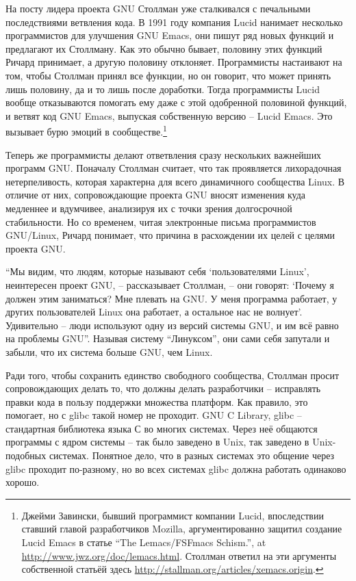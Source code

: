 На посту лидера проекта GNU Столлман уже сталкивался с печальными последствиями ветвления кода. В 1991 году компания Lucid нанимает несколько программистов для улучшения GNU Emacs, они пишут ряд новых функций и предлагают их Столлману. Как это обычно бывает, половину этих функций Ричард принимает, а другую половину отклоняет. Программисты настаивают на том, чтобы Столлман принял все функции, но он говорит, что может принять лишь половину, да и то лишь после доработки. Тогда программисты Lucid вообще отказываются помогать ему даже с этой одобренной половиной функций, и ветвят код GNU Emacs, выпуская собственную версию -- Lucid Emacs. Это вызывает бурю эмоций в сообществе.\footnote{Джейми Завински, бывший программист компании Lucid, впоследствии ставший главой разработчиков Mozilla, аргументированно защитил создание Lucid Emacs в статье \enquote{The Lemacs/FSFmacs Schism.}, at \url{http://www.jwz.org/doc/lemacs.html}. Столлман ответил на эти аргументы собственной статьёй здесь \url{http://stallman.org/articles/xemacs.origin}.}

Теперь же программисты делают ответвления сразу нескольких важнейших программ GNU. Поначалу Столлман считает, что так проявляется лихорадочная нетерпеливость, которая характерна для всего динамичного сообщества Linux. В отличие от них, сопровождающие проекта GNU вносят изменения куда медленнее и вдумчивее, анализируя их с точки зрения долгосрочной стабильности. Но со временем, читая электронные письма программистов GNU/Linux, Ричард понимает, что причина в расхождении их целей с целями проекта GNU.

\enquote{Мы видим, что людям, которые называют себя \enquote{пользователями Linux}, неинтересен проект GNU, -- рассказывает Столлман, -- они говорят: \enquote{Почему я должен этим заниматься? Мне плевать на GNU. У меня программа работает, у других пользователей Linux она работает, а остальное нас не волнует}. Удивительно -- люди используют одну из версий системы GNU, и им всё равно на проблемы GNU}. Называя систему \enquote{Линуксом}, они сами себя запутали и забыли, что их система больше GNU, чем Linux.

Ради того, чтобы сохранить единство свободного сообщества, Столлман просит сопровождающих делать то, что должны делать разработчики -- исправлять правки кода в пользу поддержки множества платформ. Как правило, это помогает, но с glibc такой номер не проходит. GNU C Library, glibc -- стандартная библиотека языка С во многих системах. Через неё общаются программы с ядром системы -- так было заведено в Unix, так заведено в Unix-подобных системах. Понятное дело, что в разных системах это общение через glibc проходит по-разному, но во всех системах glibc должна работать одинаково хорошо.


